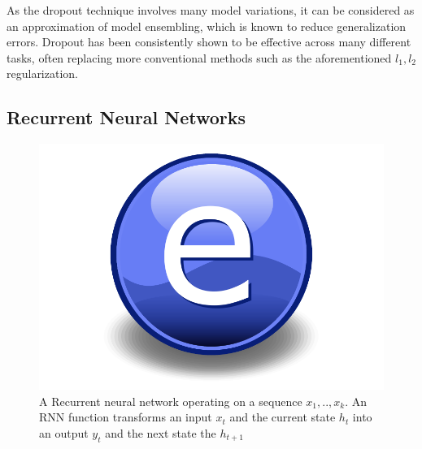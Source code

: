 As the dropout technique involves many model variations, it can be considered as an approximation of model ensembling, which is known to reduce generalization errors. Dropout has been consistently shown to be effective across many different tasks, often replacing more conventional methods such as the aforementioned $l_1,l_2$ regularization.

 

\subsection{Recurrent Neural Networks} \label{sec:recurrent}

\begin{figure}
    \centering
    \includegraphics{Figures/Electron.pdf}
    \caption{A Recurrent neural network operating on a sequence $x_1,..,x_k$. An RNN function transforms an input $x_t$ and the current state $h_t$ into an output $y_t$ and the next state the $h_{t+1}$}
    \label{fig:rnn}
\end{figure}

